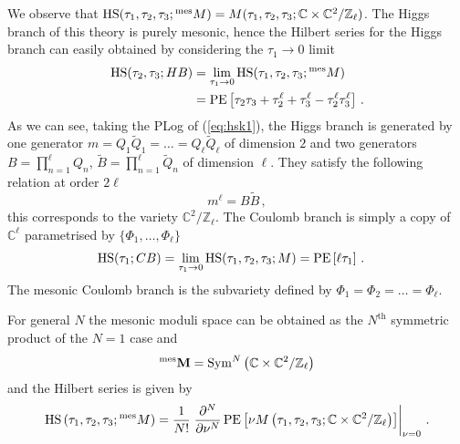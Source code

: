 \documentclass[main.tex]{subfiles}
\begin{document}
We observe that $\textrm{HS}(\tau_1,\tau_2,\tau_3;{}^{\text{mes}}M)=M(\tau_1,\tau_2,\tau_3;\mathbb{C}\times\mathbb{C}^2/\mathbb{Z}_{\ell})$.
The Higgs branch of this theory is purely mesonic, hence the Hilbert series for the Higgs branch can easily obtained by considering the $\tau_1\to0$ limit
\begin{align}
\textrm{HS}(\tau_2,\tau_3;HB)&=\lim_{\tau_1\to0}\textrm{HS}(\tau_1,\tau_2,\tau_3;{}^{\text{mes}}M)\\
&=\operatorname{\mathrm{PE}}\left[\tau_2\tau_3+\tau^{\ell}_2+\tau_3^{\ell}-\tau_2^{\ell}\tau_3^{\ell}\right]\,.\label{eq:hsk1}
\end{align}
As we can see, taking the PLog of (\ref{eq:hsk1}), the Higgs branch is generated by one generator $m=Q_1\widetilde{Q}_1=\dots=Q_{\ell}\widetilde{Q}_{\ell}$ of dimension $2$ and two generators $B=\prod_{n=1}^{\ell}Q_n$, $\widetilde{B}=\prod_{n=1}^{\ell}\widetilde{Q}_n$ of dimension $\ell$. They satisfy the following relation at order $2\ell$ 
\begin{equation}
\label{eq:rel}
m^{\ell}=B\widetilde{B} \, ,
\end{equation}
this corresponds to the variety $\mathbb{C}^2/\mathbb{Z}_{\ell}$. 
The Coulomb branch is simply a copy of $\mathbb{C}^{\ell}$ parametrised by $\{\Phi_1,\dots,\Phi_{\ell}\}$
\begin{align}
&\textrm{HS}(\tau_1;CB)=\lim_{\tau_1\to0}\textrm{HS}(\tau_1,\tau_2,\tau_3;M)=\operatorname{\mathrm{PE}}\left[\ell\tau_1\right]
\,.
\end{align}
The mesonic Coulomb branch is the subvariety defined by $\Phi_1=\Phi_2=\dots=\Phi_{\ell}$.

For general $N$ the mesonic moduli space can be obtained as the $N^{\text{th}}$ symmetric product of the $N=1$ case \cite{Feng:2007ur,Benvenuti:2006qr,Seiberg:1997ax,Gang:2011xp,Forcella:2008bb} and 
\begin{equation}
{}^{\text{mes}}\mathbf{M}=\operatorname{Sym}^N\left(\mathbb{C}\times\mathbb{C}^2/\mathbb{Z}_{\ell}\right)
\end{equation}
and the Hilbert series is given by
\begin{equation}
\textrm{HS}\left(\tau_1,\tau_2,\tau_3;{}^{\text{mes}}M\right)=\frac{1}{N!}\left.\frac{\partial^N}{\partial\nu^N}\operatorname{\mathrm{PE}}\left[\nu M\left(\tau_1,\tau_2,\tau_3;\mathbb{C}\times\mathbb{C}^2/\mathbb{Z}_{\ell}\right)\right]\right|_{\nu=0}\,.
\end{equation}
\end{document}
